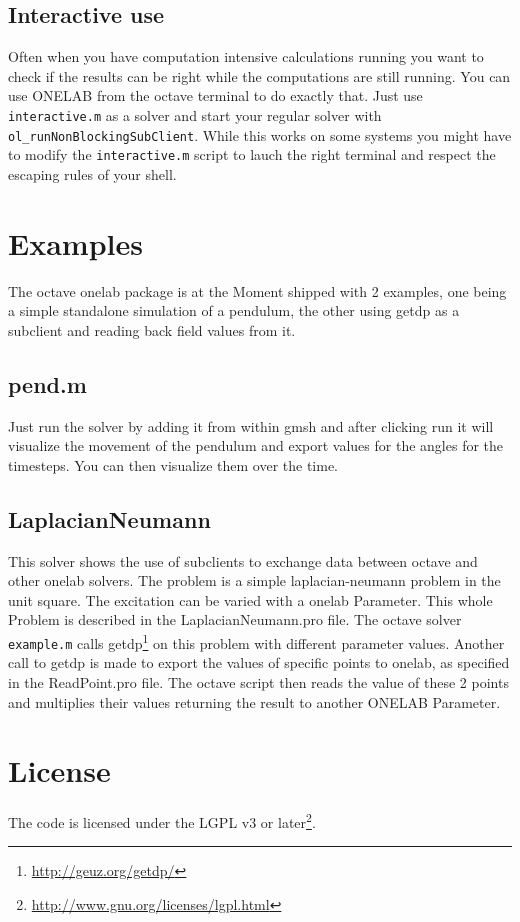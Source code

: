 \documentclass[article,english,colorback,accentcolor=tud9b,11pt]{tudreport}
\begin{document}
		\subsection{Interactive use}
		Often when you have computation intensive calculations running you want to check if the results can be right while the computations are still running. You can use ONELAB from the octave terminal to do exactly that. Just use \texttt{interactive.m} as a solver and start your regular solver with \texttt{ol\_runNonBlockingSubClient}. While this works on some systems you might have to modify the \texttt{interactive.m} script to lauch the right terminal and respect the escaping rules of your shell.
		\section{Examples}
		The octave onelab package is at the Moment shipped with 2 examples, one being a simple standalone simulation of a pendulum, the other using getdp as a subclient and reading back field values from it.
		\subsection{pend.m}
		Just run the solver by adding it from within gmsh and after clicking run it will visualize the movement of the pendulum and export values for the angles for the timesteps. You can then visualize them over the time.
		\subsection{LaplacianNeumann}
		This solver shows the use of subclients to exchange data between octave and other onelab solvers. The problem is a simple laplacian-neumann problem in the unit square. The excitation can be varied with a onelab Parameter. This whole Problem is described in the LaplacianNeumann.pro file. The octave solver \texttt{example.m} calls getdp\footnote{\url{http://geuz.org/getdp/}} on this problem with different parameter values. Another call to getdp is made to export the values of specific points to onelab, as specified in the ReadPoint.pro file. The octave script then reads the value of these 2 points and multiplies their values returning the result to another ONELAB Parameter. 

		\section{License}
		The code is licensed under the LGPL v3 or later\footnote{\url{http://www.gnu.org/licenses/lgpl.html}}.
\end{document}

